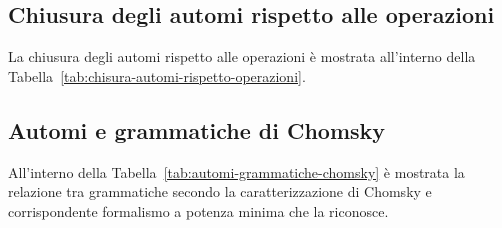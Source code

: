 \documentclass[italian, 10pt]{article}
\begin{document}
\subsection{Chiusura degli automi rispetto alle operazioni}

La chiusura degli automi rispetto alle operazioni è mostrata all'interno della Tabella~\ref{tab:chisura-automi-rispetto-operazioni}.

\begin{table}[htbp]
  \bigskip
  \centering
  \bigskip
  \caption{Chiusura degli automi rispetto alle operazioni}
  \label{tab:chisura-automi-rispetto-operazioni}
\end{table}

\subsection{Automi e grammatiche di Chomsky}

All'interno della Tabella~\ref{tab:automi-grammatiche-chomsky} è mostrata la relazione tra grammatiche secondo la caratterizzazione di Chomsky e corrispondente formalismo a potenza minima che la riconosce.
\end{document}

